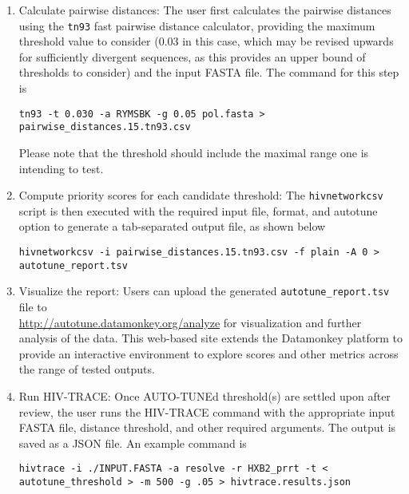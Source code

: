 \documentclass[utf8]{FrontiersinHarvard} %
\begin{document}
\begin{enumerate}

	\item{ Calculate pairwise distances: The user first calculates the pairwise distances using the {\tt tn93} fast pairwise distance calculator, providing the maximum threshold value to consider ($0.03$ in this case, which may be revised upwards for sufficiently divergent sequences, as this provides an upper bound of thresholds to consider) and the input FASTA file. The command for this step is
	            \begin{lstlisting}[style=BashInputStyle]
 tn93 -t 0.030 -a RYMSBK -g 0.05 pol.fasta > pairwise_distances.15.tn93.csv
\end{lstlisting}

	            Please note that the threshold should include the maximal range one is
	            intending to test.

	      }

	\item {Compute priority scores for each candidate threshold: The {\tt hivnetworkcsv} script is then executed with the required input file, format, and autotune option to generate a tab-separated output file, as shown below
	      \begin{lstlisting}[style=BashInputStyle]
 hivnetworkcsv -i pairwise_distances.15.tn93.csv -f plain -A 0 > autotune_report.tsv
\end{lstlisting}
	      }

	\item {Visualize the report: Users can upload the generated {\tt autotune\_report.tsv} file to \\
	      \url{http://autotune.datamonkey.org/analyze} for visualization and further analysis of the data. This web-based site extends the Datamonkey platform \citep{weaver_datamonkey_2018} to provide an interactive environment to explore scores and other metrics across the range of tested outputs. }

	\item {Run HIV-TRACE: Once AUTO-TUNEd threshold(s) are settled upon after review, the user runs the HIV-TRACE command with the appropriate input FASTA file, distance threshold, and other required arguments. The output is saved as a JSON file. An example command is
	      \begin{lstlisting}[style=BashInputStyle]
hivtrace -i ./INPUT.FASTA -a resolve -r HXB2_prrt -t < autotune_threshold > -m 500 -g .05 > hivtrace.results.json
	\end{lstlisting}
	      }


\end{enumerate}
\end{document}
